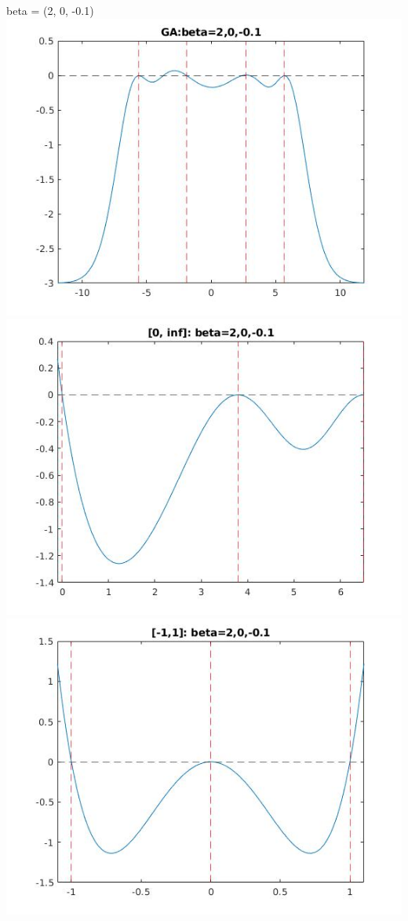 \documentclass[11pt]{beamer}
\begin{document}
\begin{frame}{beta = (2, 0, -0.1)}
\includegraphics[scale=0.18]{quadplots/GA_1.jpg}
\includegraphics[scale=0.18]{quadplots/positive_1.jpg}
\includegraphics[scale=0.18]{quadplots/11_1.jpg}

\end{frame}
\end{document}
